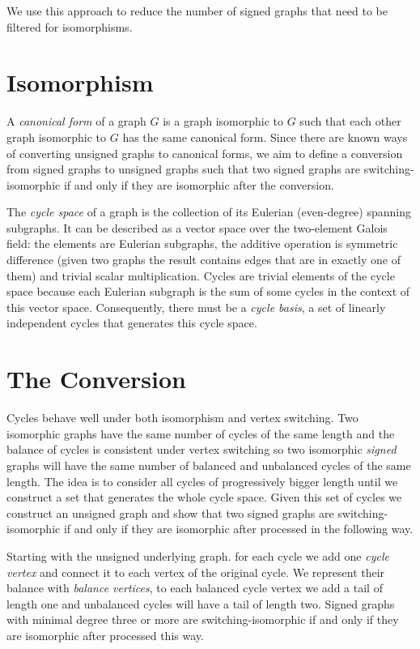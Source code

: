 We use this approach to reduce the number of signed graphs that need to be filtered for isomorphisms.

\section{Isomorphism}

A \textit{canonical form} of a graph $G$ is a graph isomorphic to $G$ such that each other graph isomorphic to $G$ has the same canonical form. Since there are known ways of converting unsigned graphs to canonical forms\cite{nauty}, we aim to define a conversion from signed graphs to unsigned graphs such that two signed graphs are switching-isomorphic if and only if they are isomorphic after the conversion.

The \textit{cycle space} of a graph is the collection of its Eulerian (even-degree) spanning subgraphs. It can be described as a vector space over the two-element Galois field: the elements are Eulerian subgraphs, the additive operation is symmetric difference (given two graphs the result contains edges that are in exactly one of them) and trivial scalar multiplication. Cycles are trivial elements of the cycle space because each Eulerian subgraph is the sum of some cycles in the context of this vector space. Consequently, there must be a \textit{cycle basis}, a set of linearly independent cycles that generates this cycle space.

\section{The Conversion}

Cycles behave well under both isomorphism and vertex switching. Two isomorphic graphs have the same number of cycles of the same length and the balance of cycles is consistent under vertex switching so two isomorphic \textit{signed} graphs will have the same number of balanced and unbalanced cycles of the same length. The idea is to consider all cycles of progressively bigger length until we construct a set that generates the whole cycle space. Given this set of cycles we construct an unsigned graph and show that two signed graphs are switching-isomorphic if and only if they are isomorphic after processed in the following way.

\begin{theorem}\label{lem2:conversion}
    Starting with the unsigned underlying graph. for each cycle we add one \textit{cycle vertex} and connect it to each vertex of the original cycle. We represent their balance with \textit{balance vertices}, to each balanced cycle vertex we add a tail of length one and unbalanced cycles will have a tail of length two. Signed graphs with minimal degree three or more are switching-isomorphic if and only if they are isomorphic after processed this way.
\end{theorem}

